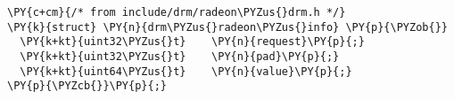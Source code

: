 \begin{Verbatim}[commandchars=\\\{\}]
\PY{c+cm}{/* from include/drm/radeon\PYZus{}drm.h */}
\PY{k}{struct} \PY{n}{drm\PYZus{}radeon\PYZus{}info} \PY{p}{\PYZob{}}
  \PY{k+kt}{uint32\PYZus{}t}    \PY{n}{request}\PY{p}{;}
  \PY{k+kt}{uint32\PYZus{}t}    \PY{n}{pad}\PY{p}{;}
  \PY{k+kt}{uint64\PYZus{}t}    \PY{n}{value}\PY{p}{;}
\PY{p}{\PYZcb{}}\PY{p}{;}
\end{Verbatim}
